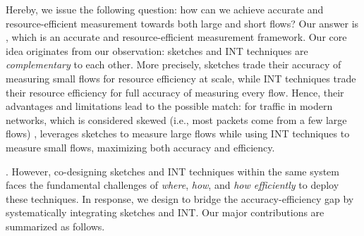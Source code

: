 Hereby, we issue the following question: how can we achieve accurate and resource-efficient measurement towards both large and short flows? Our answer is \sysname, which is an accurate and resource-efficient measurement framework. Our core idea originates from our observation: sketches and INT techniques are \emph{complementary} to each other. More precisely, sketches trade their accuracy of measuring small flows for resource efficiency at scale, while INT techniques trade their resource efficiency for full accuracy of measuring every flow. Hence, their advantages and limitations lead to the possible match: for traffic in modern networks, which is considered skewed (i.e., most packets come from a few large flows) \cite{roy2015inside,huang2021toward,caida,benson2010network,yang2018elastic}, \sysname leverages sketches to measure large flows while using INT techniques to measure small flows, maximizing both accuracy and efficiency.

. However, co-designing sketches and INT techniques within the same system faces the fundamental challenges of \emph{where}, \emph{how}, and \emph{how efficiently} to deploy these techniques. In response, we design \sysname to bridge the accuracy-efficiency gap by systematically integrating sketches and INT. Our major contributions are summarized as follows.  

